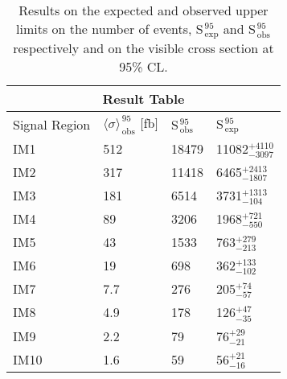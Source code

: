 \begin{table}[!h]
  \centering
  \begin{tabular}{llll}
    \toprule
    \multicolumn{4}{c}{Result Table} \\
    \midrule \midrule
    Signal Region & $\langle \sigma \rangle_\mathrm{\, obs}^{\, 95}$ [fb] & S$_\mathrm{\, obs}^{\, 95}$ & S$_\mathrm{\, exp}^{\, 95}$ \\
    \midrule
    IM1 & 512 & 18479 & 11082$_{-3097}^{+4110}$ \B \\
    IM2 & 317 & 11418 &  6465$_{-1807}^{+2413}$ \T \B \\
    IM3 & 181 & 6514  &  3731$_{-104}^{+1313}$ \T \B \\
    IM4 & 89  & 3206  &  1968$_{-550}^{+721}$ \T \B \\
    IM5 & 43  & 1533  &   763$_{-213}^{+279}$ \T \B \\
    IM6 & 19  & 698   &   362$_{-102}^{+133}$ \T \B\\
    IM7 & 7.7 & 276   &   205$_{-57}^{+74}$ \T \\
    IM8 & 4.9 & 178   &   126$_{-35}^{+47}$ \T \\
    IM9 & 2.2 & 79    &    76$_{-21}^{+29}$ \T \\
    IM10& 1.6 & 59    &    56$_{-16}^{+21}$ \T \\
    \bottomrule
  \end{tabular}
  \caption{Results on the expected and observed upper limits on the number of
    events, S$_\mathrm{\, exp}^{\, 95}$ and S$_\mathrm{\, obs}^{\, 95}$
    respectively and on the visible cross section at 95\% CL.}
  \label{tab:cs_vis_results}
\end{table}
